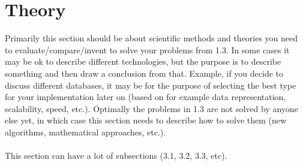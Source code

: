 \section{Theory}
Primarily this section should be about scientific methods and theories you need to evaluate/compare/invent to solve your problems from 1.3. In some cases it may be ok to describe different technologies, but the purpose is to describe something and then draw a conclusion from that. Example, if you decide to discuss different databases, it may be for the purpose of selecting the best type for your implementation later on (based on for example data representation, scalability, speed, etc.). Optimally the problems in 1.3 are not solved by anyone else yet, in which case this section needs to describe how to solve them (new algorithms, mathematical approaches, etc.).
 \\ \\
This section can have a lot of subsections (3.1, 3.2, 3.3, etc).